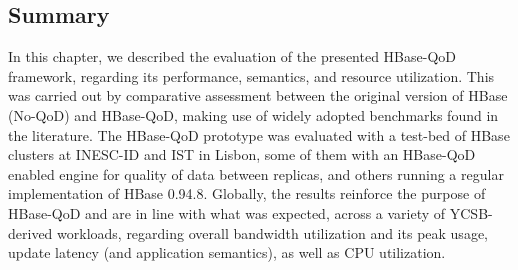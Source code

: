 
\subsection*{Summary}
In this chapter, we described the evaluation of the presented HBase-QoD framework, regarding its performance, semantics, and resource utilization. This was carried out by comparative assessment between the original version of HBase (No-QoD) and HBase-QoD, making use of widely adopted benchmarks found in the literature.
The HBase-QoD prototype was evaluated with a test-bed of HBase clusters at INESC-ID and IST in Lisbon, some of them with an HBase-QoD enabled engine for quality of data between replicas, and others running a regular implementation of HBase 0.94.8.
Globally, the results reinforce the purpose of HBase-QoD and are in line with what was expected, across a variety of YCSB-derived workloads, regarding overall bandwidth utilization and its peak usage, update latency (and application semantics), as well as CPU utilization.
